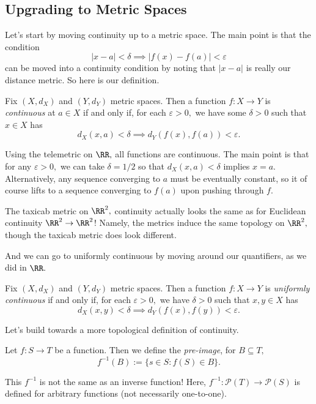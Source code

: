 \subsection{Upgrading to Metric Spaces}
Let's start by moving continuity up to a metric space. The main point is that the condition
\[|x-a|<\delta\implies|f(x)-f(a)|<\varepsilon\]
can be moved into a continuity condition by noting that $|x-a|$ is really our distance metric. So here is our definition.
\begin{definition}
	Fix $(X,d_X)$ and $(Y,d_Y)$ metric spaces. Then a function $f:X\to Y$ is \textit{continuous} at $a\in X$ if and only if, for each $\varepsilon>0,$ we have some $\delta>0$ such that $x\in X$ has
	\[d_X(x,a)<\delta\implies d_Y(f(x),f(a))<\varepsilon.\]
\end{definition}
\begin{example}
	Using the telemetric on $\RR,$ all functions are continuous. The main point is that for any $\varepsilon>0,$ we can take $\delta=1/2$ so that $d_X(x,a)<\delta$ implies $x=a.$ Alternatively, any sequence converging to $a$ must be eventually constant, so it of course lifts to a sequence converging to $f(a)$ upon pushing through $f.$
\end{example}
\begin{example}
	The taxicab metric on $\RR^2,$ continuity actually looks the same as for Euclidean continuity $\RR^2\to\RR^2$! Namely, the metrics induce the same topology on $\RR^2,$ though the taxicab metric does look different.
\end{example}
And we can go to uniformly continuous by moving around our quantifiers, as we did in $\RR.$
\begin{definition}
	Fix $(X,d_X)$ and $(Y,d_Y)$ metric spaces. Then a function $f:X\to Y$ is \textit{uniformly continuous} if and only if, for each $\varepsilon>0,$ we have $\delta>0$ such that $x,y\in X$ has
	\[d_X(x,y)<\delta\implies d_Y(f(x),f(y))<\varepsilon.\]
\end{definition}
Let's build towards a more topological definition of continuity.
\begin{definition}
	Let $f:S\to T$ be a function. Then we define the \textit{pre-image}, for $B\subseteq T,$
	\[f^{-1}(B):=\{s\in S:f(S)\in B\}.\]
\end{definition}
\begin{warn}
	This $f^{-1}$ is not the same as an inverse function! Here, $f^{-1}:\mathcal P(T)\to\mathcal P(S)$ is defined for arbitrary functions (not necessarily one-to-one).
\end{warn}

